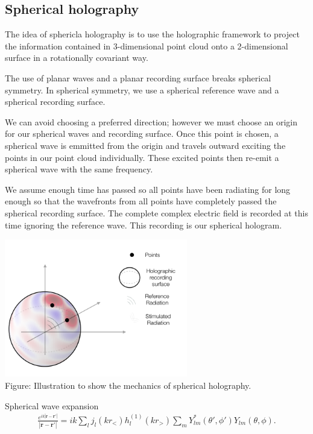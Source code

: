 \documentclass{article}
\begin{document}
\subsection{Spherical holography}

The idea of sphericla holography is to use the holographic framework to project the information contained in 3-dimensional point cloud onto a 2-dimensional surface in a rotationally covariant way. 

The use of planar waves and a planar recording surface breaks spherical symmetry. In spherical symmetry, we use a spherical reference wave and a spherical recording surface.

We can avoid choosing a preferred direction; however we must choose an origin for our spherical waves and recording surface. Once this point is chosen, a spherical wave is emmitted from the origin and travels outward exciting the points in our point cloud individually. These excited points then re-emit a spherical wave with the same frequency. 

We assume enough time has passed so all points have been radiating for long enough so that the wavefronts from all points have completely passed the spherical recording surface. The complete complex electric field is recorded at this time ignoring the reference wave. This recording is our spherical hologram.

\begin{center}
\includegraphics[width=8cm]{hologram_example}\\
Figure: Illustration to show the mechanics of spherical holography. 
\end{center}
Spherical wave expansion 
\begin{align}
    \frac{e^{ik|\textbf{r}-\textbf{r}'|}}{|\textbf{r}-\textbf{r}'|} = ik\sum_lj_l(kr_<)h_l^{(1)}(kr_>)\sum_m Y^*_{lm}(\theta',\phi')Y_{lm}(\theta,\phi).
\end{align}
\end{document}
